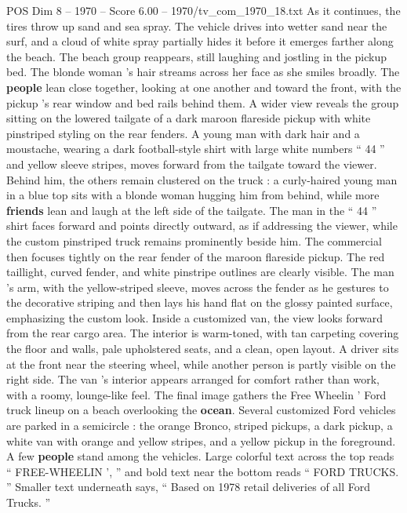 \begin{textsample}{POS Dim 8 – 1970 – Score 6.00 – 1970/tv\_com\_1970\_18.txt}
As it continues, the tires throw up sand and sea spray.
The vehicle drives into wetter sand near the surf, and a cloud of white spray partially hides it before it emerges farther along the beach.
The beach group reappears, still laughing and jostling in the pickup bed.
The blonde woman ’s hair streams across her face as she smiles broadly.
The \textbf{people} lean close together, looking at one another and toward the front, with the pickup ’s rear window and bed rails behind them.
A wider view reveals the group sitting on the lowered tailgate of a dark maroon flareside pickup with white pinstriped styling on the rear fenders.
A young man with dark hair and a moustache, wearing a dark football-style shirt with large white numbers “ 44 ” and yellow sleeve stripes, moves forward from the tailgate toward the viewer.
Behind him, the others remain clustered on the truck : a curly-haired young man in a blue top sits with a blonde woman hugging him from behind, while more \textbf{friends} lean and laugh at the left side of the tailgate.
The man in the “ 44 ” shirt faces forward and points directly outward, as if addressing the viewer, while the custom pinstriped truck remains prominently beside him.
The commercial then focuses tightly on the rear fender of the maroon flareside pickup.
The red taillight, curved fender, and white pinstripe outlines are clearly visible.
The man ’s arm, with the yellow-striped sleeve, moves across the fender as he gestures to the decorative striping and then lays his hand flat on the glossy painted surface, emphasizing the custom look.
Inside a customized van, the view looks forward from the rear cargo area.
The interior is warm-toned, with tan carpeting covering the floor and walls, pale upholstered seats, and a clean, open layout.
A driver sits at the front near the steering wheel, while another person is partly visible on the right side.
The van ’s interior appears arranged for comfort rather than work, with a roomy, lounge-like feel.
The final image gathers the Free Wheelin ’ Ford truck lineup on a beach overlooking the \textbf{ocean}.
Several customized Ford vehicles are parked in a semicircle : the orange Bronco, striped pickups, a dark pickup, a white van with orange and yellow stripes, and a yellow pickup in the foreground.
A few \textbf{people} stand among the vehicles.
Large colorful text across the top reads “ FREE-WHEELIN ’, ” and bold text near the bottom reads “ FORD TRUCKS. ” Smaller text underneath says, “ Based on 1978 retail deliveries of all Ford Trucks. ”

\end{textsample}
